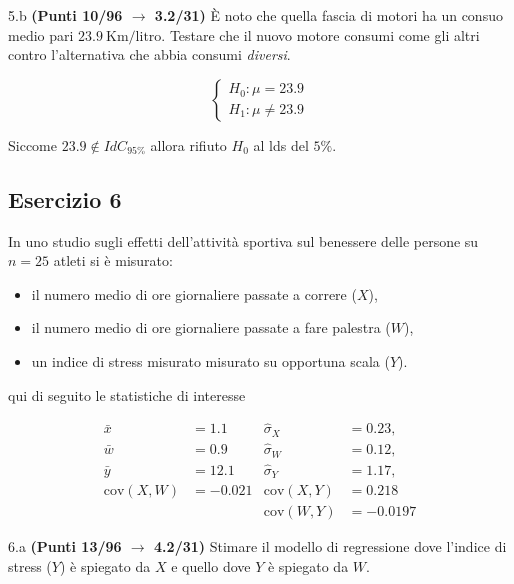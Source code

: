 \documentclass[
  11pt,
]{book}
\providecommand{\tightlist}{%
  \setlength{\itemsep}{0pt}\setlength{\parskip}{0pt}}
\theoremstyle{mytheoremstyle}
\theoremstyle{mydefstyle}
\newenvironment{sol}
  {
  \begin{tcolorbox}[enhanced,breakable,arc=0.1mm,boxrule=1pt,colback=white,colframe=iblue,
  title=\bf \fontfamily{lmss}\selectfont \hspace{.5 cm} Soluzione,drop fuzzy shadow]

}{
\end{tcolorbox}
  }
\begin{document}
5.b \textbf{(Punti 10/96 \(\rightarrow\) 3.2/31)} È noto che quella fascia di motori ha un consuo medio pari \(23.9~\text{Km/litro}\). Testare che il nuovo motore consumi come gli altri contro l'alternativa che abbia consumi \emph{diversi}.

\begin{sol}
\[
\begin{cases}
H_0:\mu=23.9\\
H_1:\mu\ne23.9
\end{cases}
\]

Siccome \(23.9\notin IdC_{95\%}\) allora rifiuto \(H_0\) al lds del \(5\%\).

\end{sol}

\subsection{Esercizio 6}\label{esercizio-6-6}

In uno studio sugli effetti dell'attività sportiva sul benessere delle persone su \(n=25\) atleti si è misurato:

\begin{itemize}
\tightlist
\item
  il numero medio di ore giornaliere passate a correre (\(X\)),
\item
  il numero medio di ore giornaliere passate a fare palestra (\(W\)),
\item
  un indice di stress misurato misurato su opportuna scala (\(Y\)).
\end{itemize}

qui di seguito le statistiche di interesse

\begin{align*}
\bar x&=1.1   &\hat \sigma_X&=0.23, \\
\bar w&=0.9   &\hat \sigma_W&=0.12,\\
\bar y&=12.1  &\hat \sigma_Y&=1.17,\\
\text{cov}(X,W)&=-0.021 &\text{cov}(X,Y)&=0.218 \\
&&\text{cov}(W,Y)&=-0.0197
\end{align*}

6.a \textbf{(Punti 13/96 \(\rightarrow\) 4.2/31)} Stimare il modello di regressione dove l'indice di stress (\(Y\)) è spiegato da \(X\) e quello dove \(Y\) è spiegato da \(W\).
\end{document}
